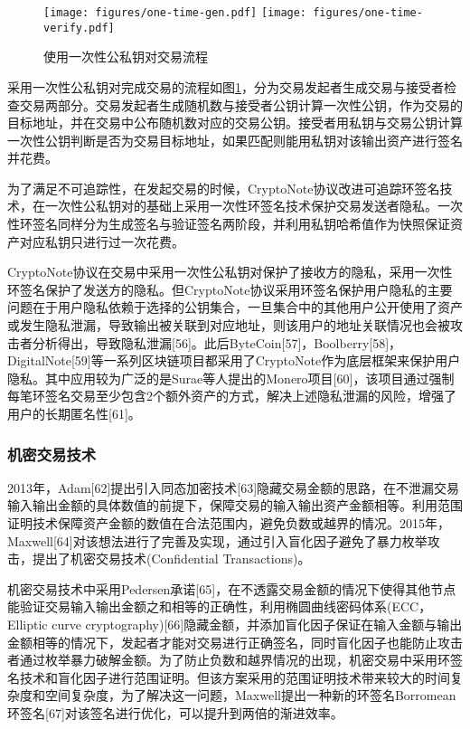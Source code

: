 \begin{figure}[ht]
  \centering%
    {\texttt{[image: figures/one-time-gen.pdf]}}%
  \hspace{4em}%
  	{\texttt{[image: figures/one-time-verify.pdf]}}
\caption{使用一次性公私钥对交易流程}
\label{fig:one-time-key}
\end{figure}

采用一次性公私钥对完成交易的流程如图\ref{fig:one-time-key}，分为交易发起者生成交易与接受者检查交易两部分。交易发起者生成随机数与接受者公钥计算一次性公钥，作为交易的目标地址，并在交易中公布随机数对应的交易公钥。接受者用私钥与交易公钥计算一次性公钥判断是否为交易目标地址，如果匹配则能用私钥对该输出资产进行签名并花费。

为了满足不可追踪性，在发起交易的时候，CryptoNote协议改进可追踪环签名技术，在一次性公私钥对的基础上采用一次性环签名技术保护交易发送者隐私。一次性环签名同样分为生成签名与验证签名两阶段，并利用私钥哈希值作为快照保证资产对应私钥只进行过一次花费。

CryptoNote协议在交易中采用一次性公私钥对保护了接收方的隐私，采用一次性环签名保护了发送方的隐私。但CryptoNote协议采用环签名保护用户隐私的主要问题在于用户隐私依赖于选择的公钥集合，一旦集合中的其他用户公开使用了资产或发生隐私泄漏，导致输出被关联到对应地址，则该用户的地址关联情况也会被攻击者分析得出，导致隐私泄漏[56]。此后ByteCoin[57]，Boolberry[58]，DigitalNote[59]等一系列区块链项目都采用了CryptoNote作为底层框架来保护用户隐私。其中应用较为广泛的是Surae等人提出的Monero项目[60]，该项目通过强制每笔环签名交易至少包含2个额外资产的方式，解决上述隐私泄漏的风险，增强了用户的长期匿名性[61]。

\subsubsection{机密交易技术}

2013年，Adam[62]提出引入同态加密技术[63]隐藏交易金额的思路，在不泄漏交易输入输出金额的具体数值的前提下，保障交易的输入输出资产金额相等。利用范围证明技术保障资产金额的数值在合法范围内，避免负数或越界的情况。2015年，Maxwell[64]对该想法进行了完善及实现，通过引入盲化因子避免了暴力枚举攻击，提出了机密交易技术(Confidential Transactions)。

机密交易技术中采用Pedersen承诺[65]，在不透露交易金额的情况下使得其他节点能验证交易输入输出金额之和相等的正确性，利用椭圆曲线密码体系(ECC，Elliptic curve cryptography)[66]隐藏金额，并添加盲化因子保证在输入金额与输出金额相等的情况下，发起者才能对交易进行正确签名，同时盲化因子也能防止攻击者通过枚举暴力破解金额。为了防止负数和越界情况的出现，机密交易中采用环签名技术和盲化因子进行范围证明。但该方案采用的范围证明技术带来较大的时间复杂度和空间复杂度，为了解决这一问题，Maxwell提出一种新的环签名Borromean环签名[67]对该签名进行优化，可以提升到两倍的渐进效率。

